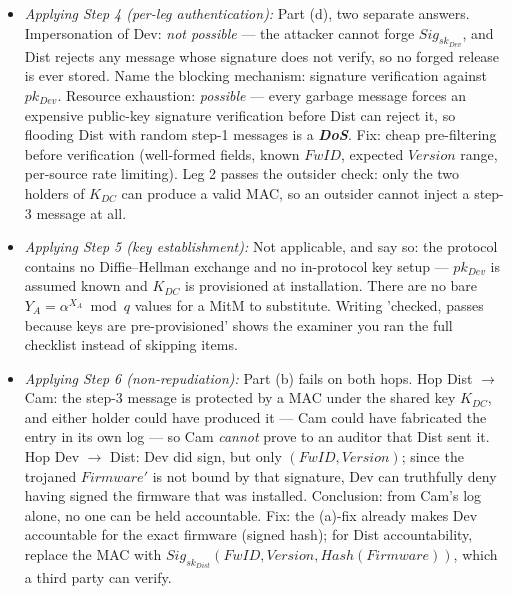 \documentclass[12pt, a4paper]{article}
\newcommand{\term}[1]{\textbf{\textit{#1}}}        %
\begin{document}
\begin{itemize}
    A common beginner error is answering 'not possible because Dist verifies the signature' --- verification says nothing about data that was never signed.
    \item \textit{Applying Step 4 (per-leg authentication):} Part (d), two separate answers. Impersonation of Dev: \emph{not possible} --- the attacker cannot forge $Sig_{sk_{Dev}}$, and Dist rejects any message whose signature does not verify, so no forged release is ever stored.
    Name the blocking mechanism: signature verification against $pk_{Dev}$. Resource exhaustion: \emph{possible} --- every garbage message forces an expensive public-key signature verification before Dist can reject it, so flooding Dist with random step-1 messages is a \term{DoS}.
    Fix: cheap pre-filtering before verification (well-formed fields, known $FwID$, expected $Version$ range, per-source rate limiting).
    Leg 2 passes the outsider check: only the two holders of $K_{DC}$ can produce a valid MAC, so an outsider cannot inject a step-3 message at all.
    \item \textit{Applying Step 5 (key establishment):} Not applicable, and say so: the protocol contains no Diffie--Hellman exchange and no in-protocol key setup --- $pk_{Dev}$ is assumed known and $K_{DC}$ is provisioned at installation.
    There are no bare $Y_A = \alpha^{X_A} \bmod q$ values for a MitM to substitute. Writing 'checked, passes because keys are pre-provisioned' shows the examiner you ran the full checklist instead of skipping items.
    \item \textit{Applying Step 6 (non-repudiation):} Part (b) fails on both hops. Hop Dist $\to$ Cam: the step-3 message is protected by a MAC under the shared key $K_{DC}$, and either holder could have produced it --- Cam could have fabricated the entry in its own log --- so Cam \emph{cannot} prove to an auditor that Dist sent it.
    Hop Dev $\to$ Dist: Dev did sign, but only $(FwID, Version)$; since the trojaned $Firmware'$ is not bound by that signature, Dev can truthfully deny having signed the firmware that was installed.
    Conclusion: from Cam's log alone, no one can be held accountable. Fix: the (a)-fix already makes Dev accountable for the exact firmware (signed hash); for Dist accountability, replace the MAC with $Sig_{sk_{Dist}}(FwID, Version, Hash(Firmware))$, which a third party can verify.


\end{itemize}
\end{document}
